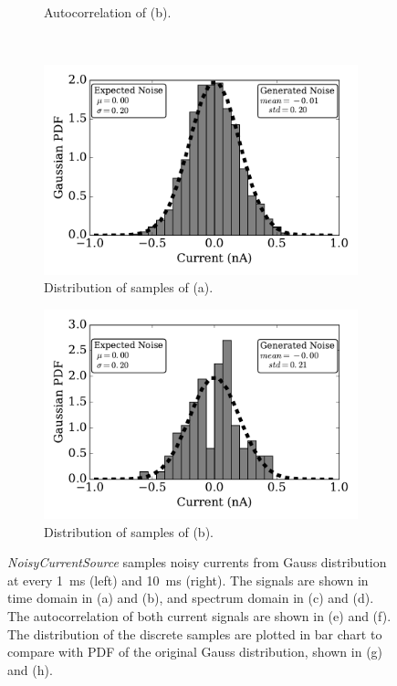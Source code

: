 \documentclass[runningheads,a4paper]{llncs}
\begin{document}
\begin{figure}[tbp!]
\begin{subfigure}[t]{0.43\textwidth}
		\caption{Autocorrelation of (b).}
	\end{subfigure}\\
	\begin{subfigure}[t]{0.43\textwidth}
		\includegraphics[width=\textwidth]{distr_dt1.pdf}
		\caption{Distribution of samples of (a).}
	\end{subfigure}
	\begin{subfigure}[t]{0.43\textwidth}
		\includegraphics[width=\textwidth]{distr_dt10.pdf}
		\caption{Distribution of samples of (b).}
	\end{subfigure}
	\caption{\textit{NoisyCurrentSource} samples noisy currents from Gauss distribution at every 1~ms (left) and 10~ms (right). The signals are shown in time domain in (a) and (b), and spectrum domain in (c) and (d). The autocorrelation of both current signals are shown in (e) and (f). The distribution of the discrete samples are plotted in bar chart to compare with PDF of the original Gauss distribution, shown in (g) and (h).}
	\label{Fig:lif_curr}
\end{figure}
\end{document}
